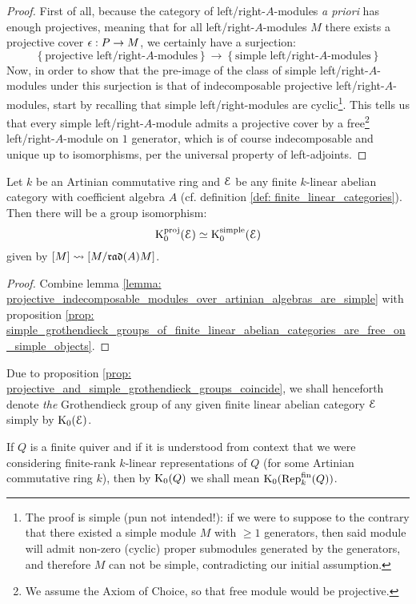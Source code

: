                 \begin{proof}
                    First of all, because the category of left/right-$A$-modules \textit{a priori} has enough projectives, meaning that for all left/right-$A$-modules $M$ there exists a projective cover $\epsilon: P \to M$, we certainly have a surjection:
                        $$
                            \left\{\text{projective left/right-$A$-modules}\right\}
                            \to
                            \left\{\text{simple left/right-$A$-modules}\right\}
                        $$
                    Now, in order to show that the pre-image of the class of simple left/right-$A$-modules under this surjection is that of indecomposable projective left/right-$A$-modules, start by recalling that simple left/right-modules are cyclic\footnote{The proof is simple (pun not intended!): if we were to suppose to the contrary that there existed a simple module $M$ with $\geq 1$ generators, then said module will admit non-zero (cyclic) proper submodules generated by the generators, and therefore $M$ can not be simple, contradicting our initial assumption.}. This tells us that every simple left/right-$A$-module admits a projective cover by a free\footnote{We assume the Axiom of Choice, so that free module would be projective.} left/right-$A$-module on $1$ generator, which is of course indecomposable and unique up to isomorphisms, per the universal property of left-adjoints.
                \end{proof}
            \begin{proposition} \label{prop: projective_and_simple_grothendieck_groups_coincide}
                Let $k$ be an Artinian commutative ring and $\mathcal{E}$ be any finite $k$-linear abelian category with coefficient algebra $A$ (cf. definition \ref{def: finite_linear_categories}). Then there will be a group isomorphism:
                    $$\mathrm{K}_0^{\mathrm{proj}}(\mathcal{E}) \simeq \mathrm{K}_0^{\mathrm{simple}}(\mathcal{E})$$
                given by $[M] \leadsto [M/\mathfrak{rad}(A) M]$.
            \end{proposition}
                \begin{proof}
                    Combine lemma \ref{lemma: projective_indecomposable_modules_over_artinian_algebras_are_simple} with proposition \ref{prop: simple_grothendieck_groups_of_finite_linear_abelian_categories_are_free_on_simple_objects}.
                \end{proof}
            \begin{convention}
                Due to proposition \ref{prop: projective_and_simple_grothendieck_groups_coincide}, we shall henceforth denote \textit{the} Grothendieck group of any given finite linear abelian category $\mathcal{E}$ simply by $\mathrm{K}_0(\mathcal{E})$.
            \end{convention}
            \begin{convention}
                If $Q$ is a finite quiver and if it is understood from context that we were considering finite-rank $k$-linear representations of $Q$ (for some Artinian commutative ring $k$), then by $\mathrm{K}_0(Q)$ we shall mean $\mathrm{K}_0(\mathrm{Rep}_k^{\mathrm{fin}}(Q))$.
            \end{convention}
            
